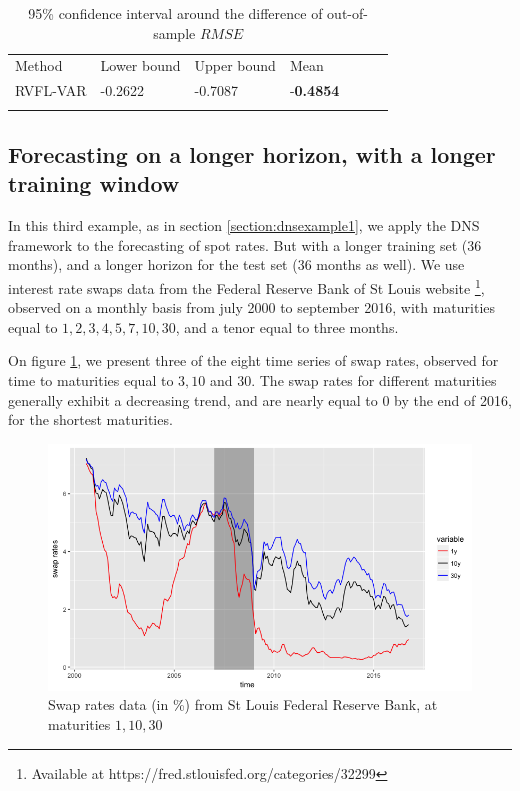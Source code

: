 \begin{table}[!htb]
\begin{center}
\caption{95\% confidence interval around the difference of out-of-sample $RMSE$}
\label{tab:confint2}       %
\begin{tabular}{lllllll}
\hline\noalign{\smallskip}
Method & Lower bound & Upper bound  & Mean \\
\noalign{\smallskip}\hline\noalign{\smallskip}
  RVFL-VAR & -0.2622 & -0.7087 & -\textbf{0.4854} \\
\noalign{\smallskip}\hline
\end{tabular}
\end{center}
\end{table}

\subsection{Forecasting on a longer horizon, with a longer training window}

In this third example, as in section \ref{section:dnsexample1}, we apply the DNS framework to the forecasting of spot rates. But with a longer training set (36 months), and a longer horizon for the test set (36 months as well). We use interest rate swaps data from the Federal Reserve Bank of St Louis website \footnote{Available at https://fred.stlouisfed.org/categories/32299}, observed on a monthly basis from july 2000 to september 2016, with maturities equal to $1, 2, 3, 4, 5, 7, 10, 30$, and a tenor equal to three months.

\medskip

On figure \ref{example3:1}, we present three of the eight time series of swap rates, observed for time to maturities equal to $3, 10$ and $30$. The swap rates for different maturities generally exhibit a decreasing trend, and are nearly equal to 0 by the end of 2016, for the shortest maturities.

\begin{figure}[!htb]
\centering
  \includegraphics[width=14cm]{gfx/chapter-rvfl-mts/fredswaprates}
\caption{Swap rates data (in \%) from St Louis Federal Reserve Bank, at maturities $1, 10, 30$}
\label{example3:1}       %
\end{figure}

